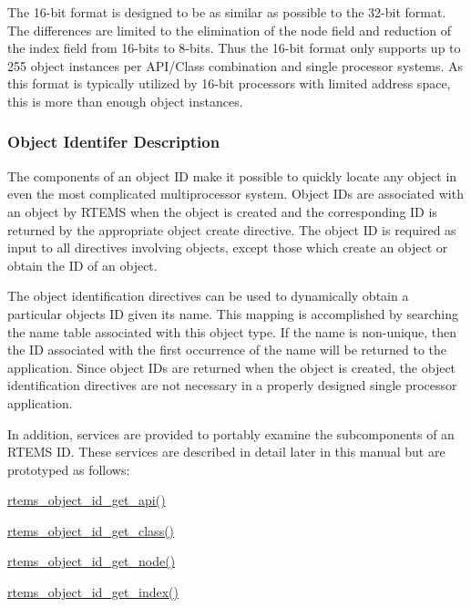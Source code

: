 The 16-\/bit format is designed to be as similar as possible to the 32-\/bit format. The differences are limited to the elimination of the node field and reduction of the index field from 16-\/bits to 8-\/bits. Thus the 16-\/bit format only supports up to 255 object instances per A\+P\+I/\+Class combination and single processor systems. As this format is typically utilized by 16-\/bit processors with limited address space, this is more than enough object instances.\hypertarget{group__RTEMSAPIClassic_ClassicRTEMSSubSecObjectIdentiferDescription}{}\subsubsection{Object Identifer Description}\label{group__RTEMSAPIClassic_ClassicRTEMSSubSecObjectIdentiferDescription}
The components of an object ID make it possible to quickly locate any object in even the most complicated multiprocessor system. Object ID\textquotesingle{}s are associated with an object by R\+T\+E\+MS when the object is created and the corresponding ID is returned by the appropriate object create directive. The object ID is required as input to all directives involving objects, except those which create an object or obtain the ID of an object.

The object identification directives can be used to dynamically obtain a particular object\textquotesingle{}s ID given its name. This mapping is accomplished by searching the name table associated with this object type. If the name is non-\/unique, then the ID associated with the first occurrence of the name will be returned to the application. Since object I\+Ds are returned when the object is created, the object identification directives are not necessary in a properly designed single processor application.

In addition, services are provided to portably examine the subcomponents of an R\+T\+E\+MS ID. These services are described in detail later in this manual but are prototyped as follows\+:


\begin{DoxyItemize}
\item \mbox{\hyperlink{group__ClassicClassInfo_ga8eaead233ac75fec14889179a4131bd9}{rtems\+\_\+object\+\_\+id\+\_\+get\+\_\+api()}}
\item \mbox{\hyperlink{group__ClassicClassInfo_ga99ed333220b605c83b1c5ddfcedd9d87}{rtems\+\_\+object\+\_\+id\+\_\+get\+\_\+class()}}
\item \mbox{\hyperlink{group__ClassicClassInfo_gadc791c4cbb38bb872350921b292caf1d}{rtems\+\_\+object\+\_\+id\+\_\+get\+\_\+node()}}
\item \mbox{\hyperlink{group__ClassicClassInfo_ga3a392f8dd107326289aecdf1543f0d94}{rtems\+\_\+object\+\_\+id\+\_\+get\+\_\+index()}}
\end{DoxyItemize}

